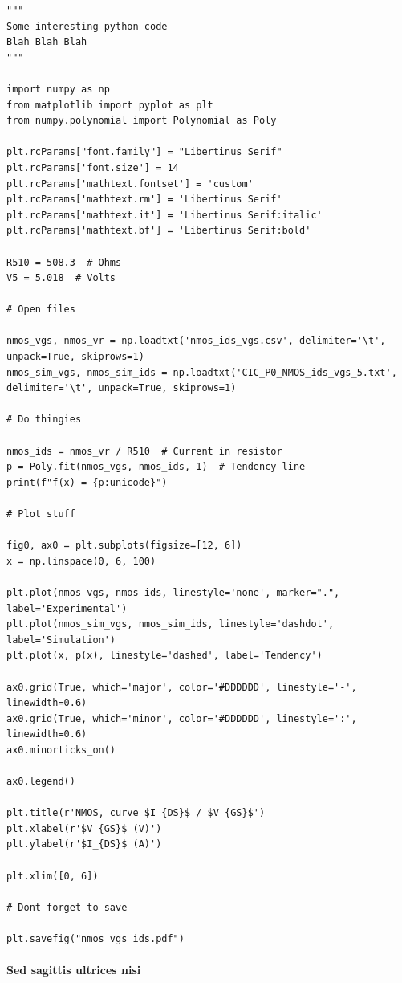 \begin{lstlisting}[caption={Some Python Code}, language=PythonPlus, style=ColorEX]
"""
Some interesting python code 
Blah Blah Blah
"""

import numpy as np
from matplotlib import pyplot as plt
from numpy.polynomial import Polynomial as Poly

plt.rcParams["font.family"] = "Libertinus Serif"
plt.rcParams['font.size'] = 14
plt.rcParams['mathtext.fontset'] = 'custom'
plt.rcParams['mathtext.rm'] = 'Libertinus Serif'
plt.rcParams['mathtext.it'] = 'Libertinus Serif:italic'
plt.rcParams['mathtext.bf'] = 'Libertinus Serif:bold'

R510 = 508.3  # Ohms
V5 = 5.018  # Volts

# Open files

nmos_vgs, nmos_vr = np.loadtxt('nmos_ids_vgs.csv', delimiter='\t', unpack=True, skiprows=1)
nmos_sim_vgs, nmos_sim_ids = np.loadtxt('CIC_P0_NMOS_ids_vgs_5.txt', delimiter='\t', unpack=True, skiprows=1)

# Do thingies

nmos_ids = nmos_vr / R510  # Current in resistor
p = Poly.fit(nmos_vgs, nmos_ids, 1)  # Tendency line
print(f"f(x) = {p:unicode}")

# Plot stuff

fig0, ax0 = plt.subplots(figsize=[12, 6])
x = np.linspace(0, 6, 100)

plt.plot(nmos_vgs, nmos_ids, linestyle='none', marker=".", label='Experimental')
plt.plot(nmos_sim_vgs, nmos_sim_ids, linestyle='dashdot', label='Simulation')
plt.plot(x, p(x), linestyle='dashed', label='Tendency')

ax0.grid(True, which='major', color='#DDDDDD', linestyle='-', linewidth=0.6)
ax0.grid(True, which='minor', color='#DDDDDD', linestyle=':', linewidth=0.6)
ax0.minorticks_on()

ax0.legend()

plt.title(r'NMOS, curve $I_{DS}$ / $V_{GS}$')
plt.xlabel(r'$V_{GS}$ (V)')
plt.ylabel(r'$I_{DS}$ (A)')

plt.xlim([0, 6])

# Dont forget to save

plt.savefig("nmos_vgs_ids.pdf")
\end{lstlisting}


\paragraph{Sed sagittis ultrices nisi}

